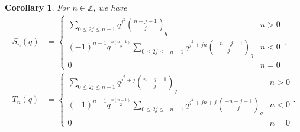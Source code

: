 \documentclass[a4paper]{article}
\newcommand{\Zz}{\mathbb{Z}}
\numberwithin{equation}{section}
\theoremstyle{plain}
\newtheorem{coro}{Corollary}
\begin{document}
\begin{appendices}
\begin{coro}
For $n\in\Zz$, we have
\begin{align}
\label{eq: Sn}
S_n(q)&=\begin{cases}
\sum_{0\leq 2j\leq n-1}q^{j^2}\binom{n-j-1}{j}_q & n>0\\
(-1)^{n-1}q^\frac{n(n-1)}{2}\sum_{0\leq 2j \leq -n-1}q^{j^2+jn}\binom{-n-j-1}{j}_q & n< 0\\
0 & n=0
\end{cases}, \\
\label{eq: Tn}
T_n(q)&=\begin{cases}
\sum_{0\leq 2j\leq n-1}q^{j^2+j}\binom{n-j-1}{j}_q & n>0\\
(-1)^{n-1}q^\frac{n(n+1)}{2}\sum_{0\leq 2j\leq -n-1}q^{j^2+jn+j}\binom{-n-j-1}{j}_q & n<0\\
0 & n=0
\end{cases}. 
\end{align}
\end{coro}
%
%

\end{appendices}
\end{document}
